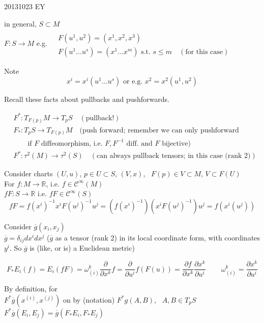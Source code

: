 20131023 EY

in general, $S \subset M$ \\
$F:S \to M$
e.g. $\begin{aligned} & \quad \\ 
  & F(u^1, u^2) = (x^1, x^2, x^3 ) \\ 
  & F(u^1 \dots u^s ) = (x^1 \dots x^m) \text{ s.t. } s\leq m \quad (\text{for this case}) \end{aligned}$

Note 
\[
x^i = x^i(u^1 \dots u^s ) \text{ or e.g. } x^2 = x^2(u^1, u^2 )
\]

Recall these facts about pullbacks and pushforwards.  

\[
\begin{aligned}
  & F^*: T_{F(p)}M \to T_pS \quad (\text{pullback!}) \\ 
  & F_*: T_pS \to T_{F(p)}M \quad (\text{push forward; remember we can only pushforward} \\
  & \qquad \text{if $F$ diffeomorphism, i.e. $F,F^{-1}$ diff. and $F$ bijective}) \\
  &  F^*: \tau^2(M) \to \tau^2(S) \quad (\text{can always pullback tensors; in this case (rank 2)})
\end{aligned}
\]

Consider charts $(U,u)$, $p\in U\subset S$, $(V,x)$, \, $F(p) \in V \subset M$, $V \subset F(U)$ \\
\quad For $f:M \to \mathbb{R}$, i.e. $f\in \mathcal{C}^{\infty}(M)$ \\
\quad $fF: S \to \mathbb{R}$ i.e. $fF \in \mathcal{C}^{\infty}(S)$ 
\[
fF = f(x^i)^{-1}x^i F(u^j)^{-1} u^j = (f(x^i)^{-1})(x^i F(u^j)^{-1})u^j = f(x^i(u^j))
\]

Consider $\overline{g}(x_i,x_j)$ \\
\phantom{Consider } $\overline{g} = \delta_{ij} dx^i dx^j$ ($\overline{g}$ as a tensor (rank 2) in its local coordinate form, with coordinates $y^i$.  So $\overline{g}$ is (like, or is) a Euclidean metric)


\[
F_* E_i(f) = E_i(fF) = \omega^k_{(i)} \frac{ \partial }{ \partial x^k}f = \frac{ \partial }{ \partial u^i} f(F(u)) = \frac{ \partial f}{ \partial x^k } \frac{ \partial x^k }{ \partial u^i } \quad \quad \, \omega_{(i)}^k = \frac{ \partial x^k}{ \partial u^i }
\]

By definition, for  \\
\quad $F^*\overline{g}(x^{(i)}, x^{(j)})$ on by (notation) $F^*g(A,B)$, \, $A,B \in T_pS$ \\
\quad $F^*\overline{g}(E_i, E_j) = \overline{g}(F_* E_i, F_* E_j)$

